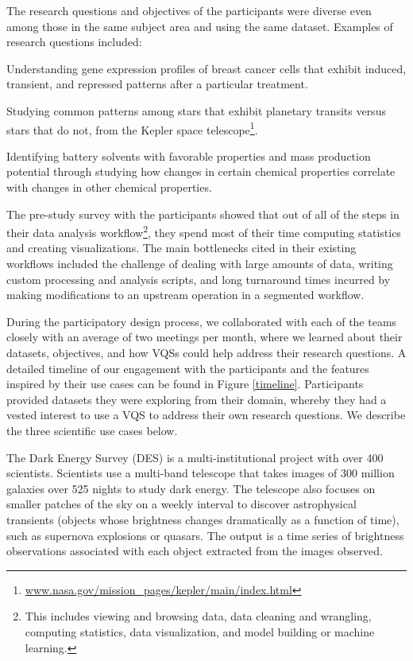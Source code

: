 \par The research questions and objectives of the participants were diverse even among those in the same subject area and using the same dataset. Examples of research questions included: 
\begin{denselist}
\item Understanding gene expression profiles of breast cancer cells that exhibit induced, transient, and repressed patterns after a particular treatment.
\item Studying common patterns among stars that exhibit planetary transits versus stars that do not, from the Kepler space telescope\footnote{\url{www.nasa.gov/mission_pages/kepler/main/index.html}}.
\item Identifying battery solvents with favorable properties and mass production potential through studying how changes in certain chemical properties correlate with changes in other chemical properties. 
\end{denselist}

\noindent The pre-study survey with the participants showed that out of all of the steps in their data analysis workflow\footnote{This includes viewing and browsing data, data cleaning and wrangling, computing statistics, data visualization, and model building or machine learning.}, they spend most of their time computing statistics and creating visualizations.
The main bottlenecks cited in their existing workflows included the challenge of dealing with large amounts of data, writing custom processing and analysis scripts, and long turnaround times incurred by making modifications to an upstream operation in a segmented workflow. %
\par During the participatory design process, we collaborated with each of the teams closely with an average of two meetings per month, where we learned about their datasets, objectives, and how VQSs could help address their research questions. A detailed timeline of our engagement with the participants and the features inspired by their use cases can be found in Figure \ref{timeline}. Participants provided datasets they were exploring from their domain, whereby they had a vested interest to use a VQS to address their own research questions. We  describe the three scientific use cases below.

 The Dark Energy Survey (DES) is a multi-institutional project with over 400 scientists. Scientists use a multi-band telescope that takes images of 300 million galaxies over 525 nights to study dark energy\cite{Drlica-Wagner2017}. The telescope also focuses on smaller patches of the sky on a weekly interval to discover astrophysical transients (objects whose brightness changes dramatically as a function of time), such as supernova explosions or quasars. The output is a time series of brightness observations associated with each object extracted from the images observed. %

